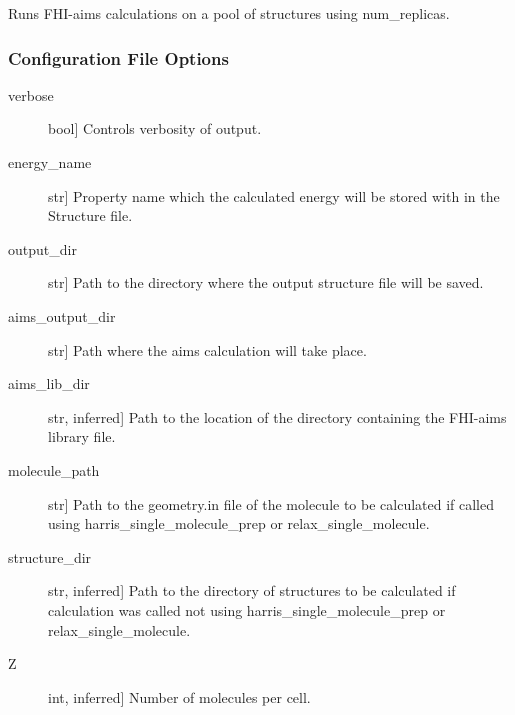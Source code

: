 \documentclass[letterpaper,10pt,english]{sphinxmanual}
\begin{document}
\begin{fulllineitems}
\begin{fulllineitems}
\end{fulllineitems}


\begin{fulllineitems}
\label{\detokenize{index:Genarris.genarris_master.Genarris.Run_FHI_Aims_Batch}}
Runs FHI-aims calculations on a pool of structures using num\_replicas.
\subsubsection*{Configuration File Options}
\begin{description}
\item[{verbose}] \leavevmode{[}bool{]}
Controls verbosity of output.

\item[{energy\_name}] \leavevmode{[}str{]}
Property name which the calculated energy will be stored with in the
Structure file.

\item[{output\_dir}] \leavevmode{[}str{]}
Path to the directory where the output structure file will be saved.

\item[{aims\_output\_dir}] \leavevmode{[}str{]}
Path where the aims calculation will take place.

\item[{aims\_lib\_dir}] \leavevmode{[}str, inferred{]}
Path to the location of the directory containing the FHI-aims library
file.

\item[{molecule\_path}] \leavevmode{[}str{]}
Path to the geometry.in file of the molecule to be calculated if
called using harris\_single\_molecule\_prep or relax\_single\_molecule.

\item[{structure\_dir}] \leavevmode{[}str, inferred{]}
Path to the directory of structures to be calculated if calculation
was called not using harris\_single\_molecule\_prep or
relax\_single\_molecule.

\item[{Z}] \leavevmode{[}int, inferred{]}
Number of molecules per cell.

\end{description}

\end{fulllineitems}


\end{fulllineitems}




\renewcommand{\indexname}{Index}
\printindex
\end{document}
